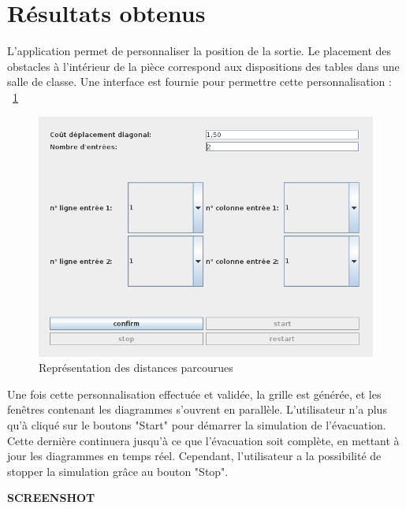 \section{Résultats obtenus}
	L'application permet de personnaliser la position de la sortie. Le placement des obstacles à l'intérieur de la pièce correspond aux dispositions des tables dans une salle de classe. Une interface est fournie pour permettre cette personnalisation : ~\ref{fig:distances_parcourues}
		
	\begin{figure}[!H]
	\centering
	\includegraphics[scale=0.7]{imagesPNG/personnalisation.png}
	\caption{Représentation des distances parcourues}
	\label{fig:distances_parcourues}
	\end{figure}
		
	Une fois cette personnalisation effectuée et validée, la grille est générée, et les fenêtres contenant les diagrammes s'ouvrent en parallèle. L'utilisateur n'a plus qu'à cliqué sur le boutons "Start" pour démarrer la simulation de l'évacuation. Cette dernière continuera jusqu'à ce que l'évacuation soit complète, en mettant à jour les diagrammes en temps réel. Cependant, l'utilisateur a la possibilité de stopper la simulation grâce au bouton "Stop".
		
	\textbf{SCREENSHOT}